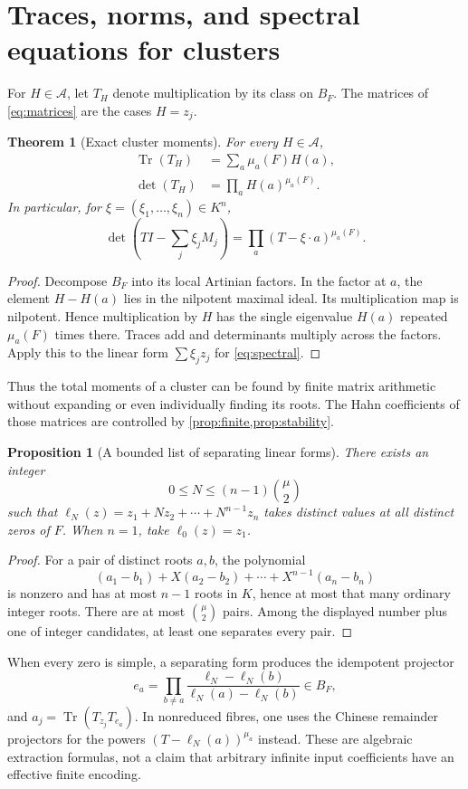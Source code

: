 \documentclass[11pt,letterpaper]{article}
\newtheorem{theorem}{Theorem}[section]
\newtheorem{proposition}[proposition]{Proposition}
\theoremstyle{definition}
\theoremstyle{remark}
\newcommand{\A}{\mathscr A}
\newcommand{\Tr}{\operatorname{Tr}}
\numberwithin{equation}{section}
\begin{document}
\section{Traces, norms, and spectral equations for clusters}\label{sec:traces}
For $H\in\A$, let $T_H$ denote multiplication by its class on $B_F$. The matrices of \eqref{eq:matrices} are the cases $H=z_j$.

\begin{theorem}[Exact cluster moments]\label{thm:traces}
For every $H\in\A$,
\begin{align}
 \Tr(T_H)&=\sum_a\mu_a(F)H(a),\label{eq:trace}\\
 \det(T_H)&=\prod_aH(a)^{\mu_a(F)}.\label{eq:norm}
\end{align}
In particular, for $\xi=(\xi_1,\ldots,\xi_n)\in K^n$,
\begin{equation}\label{eq:spectral}
 \det\left(TI-\sum_j\xi_jM_j\right)
 =\prod_a(T-\xi\cdot a)^{\mu_a(F)}.
\end{equation}
\end{theorem}
\begin{proof}
Decompose $B_F$ into its local Artinian factors. In the factor at $a$, the element $H-H(a)$ lies in the nilpotent maximal ideal. Its multiplication map is nilpotent. Hence multiplication by $H$ has the single eigenvalue $H(a)$ repeated $\mu_a(F)$ times there. Traces add and determinants multiply across the factors. Apply this to the linear form $\sum\xi_jz_j$ for \eqref{eq:spectral}.
\end{proof}
Thus the total moments of a cluster can be found by finite matrix arithmetic without expanding or even individually finding its roots. The Hahn coefficients of those matrices are controlled by \cref{prop:finite,prop:stability}.

\begin{proposition}[A bounded list of separating linear forms]\label{prop:separation}
There exists an integer
\[
 0\leq N\leq (n-1)\binom{\mu}{2}
\]
such that $\ell_N(z)=z_1+Nz_2+\cdots+N^{n-1}z_n$ takes distinct values at all distinct zeros of $F$. When $n=1$, take $\ell_0(z)=z_1$.
\end{proposition}
\begin{proof}
For a pair of distinct roots $a,b$, the polynomial
\[
 (a_1-b_1)+X(a_2-b_2)+\cdots+X^{n-1}(a_n-b_n)
\]
is nonzero and has at most $n-1$ roots in $K$, hence at most that many ordinary integer roots. There are at most $\binom\mu2$ pairs. Among the displayed number plus one of integer candidates, at least one separates every pair.
\end{proof}
When every zero is simple, a separating form produces the idempotent projector
\[
 e_a=\prod_{b\ne a}\frac{\ell_N-\ell_N(b)}{\ell_N(a)-\ell_N(b)}\in B_F,
\]
and $a_j=\Tr(T_{z_j}T_{e_a})$. In nonreduced fibres, one uses the Chinese remainder projectors for the powers $(T-\ell_N(a))^{\mu_a}$ instead. These are algebraic extraction formulas, not a claim that arbitrary infinite input coefficients have an effective finite encoding.
\end{document}
